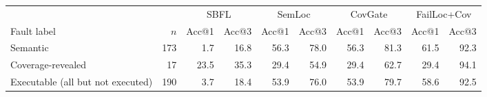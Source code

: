 \begin{tabular}{lrrrrrrrrr}
\toprule
 & & \multicolumn{2}{c}{SBFL} & \multicolumn{2}{c}{SemLoc} & \multicolumn{2}{c}{CovGate} & \multicolumn{2}{c}{FailLoc+Cov} \\
\cmidrule(lr){3-4}\cmidrule(lr){5-6}\cmidrule(lr){7-8}\cmidrule(lr){9-10}
Fault label & $n$ & Acc@1 & Acc@3 & Acc@1 & Acc@3 & Acc@1 & Acc@3 & Acc@1 & Acc@3 \\
\midrule
Semantic & 173 & 1.7 & 16.8 & 56.3 & 78.0 & 56.3 & 81.3 & 61.5 & 92.3 \\
Coverage-revealed & 17 & 23.5 & 35.3 & 29.4 & 54.9 & 29.4 & 62.7 & 29.4 & 94.1 \\
Executable (all but not executed) & 190 & 3.7 & 18.4 & 53.9 & 76.0 & 53.9 & 79.7 & 58.6 & 92.5 \\
\bottomrule
\end{tabular}
